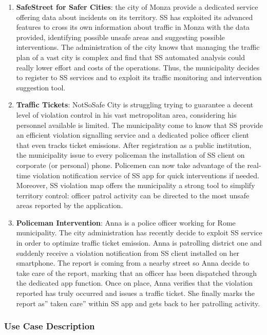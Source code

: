 \begin{enumerate}
	\item \textbf{SafeStreet for Safer Cities}: the city of Monza provide a dedicated service offering data about incidents on its territory. SS has exploited its advanced features to cross its own information about traffic in Monza with the data provided, identifying possible unsafe areas and suggesting possible interventions. The administration of the city knows that managing the traffic plan of a vast city is complex and find that SS automated analysis could really lower effort and costs of the operations. Thus, the municipality decides to register to SS services and to exploit its traffic monitoring and intervention suggestion tool. 
	\item \textbf{Traffic Tickets}: NotSoSafe City is struggling trying to guarantee a decent level of violation control in his vast metropolitan area, considering his personnel available is limited. The municipality come to know that SS provide an efficient violation signalling service and a dedicated police officer client that even tracks ticket emissions. After registration as a public institution, the municipality issue to every policeman the installation of SS client on corporate (or personal) phone. Policemen can now take advantage of the real-time violation notification service of SS app for quick interventions if needed. Moreover, SS violation map offers the municipality a strong tool to simplify territory control: officer patrol activity can be directed to the most unsafe areas reported by the application.
	\item  \textbf{Policeman Intervention}: Anna is a police officer working for Rome municipality. The city administration has recently decide to exploit SS service in order to optimize traffic ticket emission. Anna is patrolling district one and suddenly receive a violation notification from SS client installed on her smartphone. The report is coming from a nearby street so Anna decide to take care of the report, marking that an officer has been dispatched  through the dedicated app function. Once on place, Anna verifies that the violation reported has truly occurred and issues a traffic ticket. She finally marks the report as” taken care” within SS app and gets back to her patrolling activity.
	\end{enumerate}
	
	
	\subsubsection{Use Case Description}
	\medskip
	
